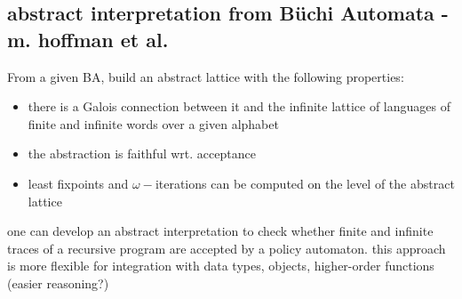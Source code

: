 \documentclass[]{article}
\begin{document}
\subsection{abstract interpretation from B\"uchi Automata - m. hoffman et al.}
From a given BA, build an abstract lattice with the following properties: 
\begin{itemize}
    \item there is a Galois connection between it and the infinite lattice of languages of finite and infinite words over a given alphabet
    \item the abstraction is faithful wrt. acceptance
    \item least fixpoints and $\omega-$iterations can be computed on the level of the abstract lattice
\end{itemize}
one can develop an abstract interpretation to check whether finite and infinite traces of a recursive program are accepted by a policy automaton. 
this approach is more flexible for integration with data types, objects, higher-order functions (easier reasoning?)
\end{document}
